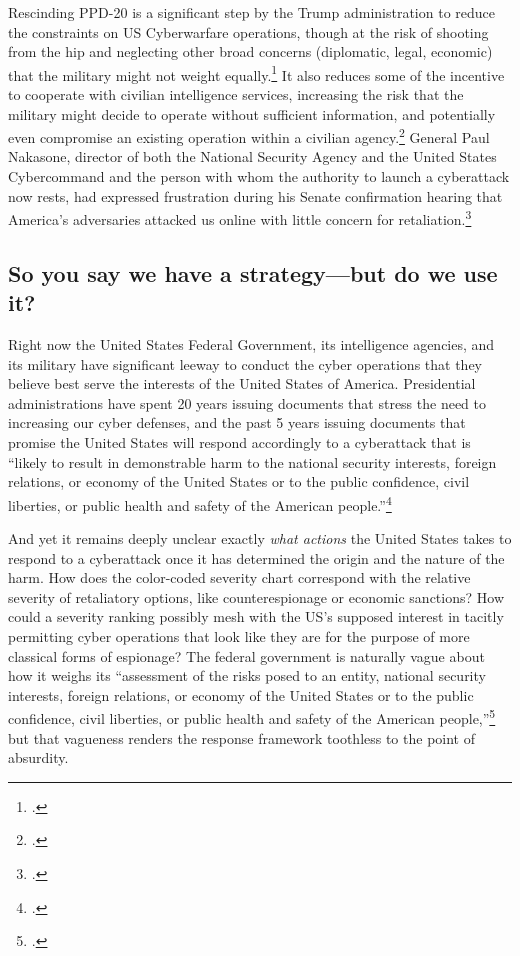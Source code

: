 \documentclass{report}
\begin{document}
\begin{refsegment}
Rescinding PPD-20 is a significant step by the Trump administration to reduce the constraints on US Cyberwarfare operations, though at the risk of shooting from the hip and neglecting other broad concerns (diplomatic, legal, economic) that the military might not weight equally.\footcite{starks_ramifications_2018} It also reduces some of the incentive to cooperate with civilian intelligence services, increasing the risk that the military might decide to operate without sufficient information, and potentially even compromise an existing operation within a civilian agency.\footcite{hawkins_cybersecurity_2018} General Paul Nakasone, director of both the National Security Agency and the United States Cybercommand and the person with whom the authority to launch a cyberattack now rests, had expressed frustration during his Senate confirmation hearing that America's  adversaries attacked us online with little concern for retaliation.\footcite{sanger_trump_2018}

\subsection{So you say we have a strategy---but do we use it?}
Right now the United States Federal Government, its intelligence agencies, and its military have significant leeway to conduct the cyber operations that they believe best serve the interests of the United States of America. Presidential administrations have spent 20 years issuing documents that stress the need to increasing our cyber defenses, and the past 5 years issuing documents that promise the United States will respond accordingly to a cyberattack that is ``likely to result in demonstrable harm to the national security interests, foreign relations, or economy of the United States or to the public confidence, civil liberties, or public health and safety of the American people.''\footcite{office_of_the_press_secretary_fact_2016}

And yet it remains deeply unclear exactly \emph{what actions} the United States takes to respond to a cyberattack once it has determined the origin and the nature of the harm. How does the color-coded severity chart correspond with the relative severity of retaliatory options, like counterespionage or economic sanctions? How could a severity ranking possibly mesh with the US's supposed interest in tacitly permitting cyber operations that look like they are for the purpose of more classical forms of espionage? The federal government is naturally vague about how it weighs its ``assessment of the risks posed to an entity, national security interests, foreign relations, or economy of the United States or to the public confidence, civil liberties, or public health and safety of the American people,''\footcite{office_of_the_press_secretary_fact_2016} but that vagueness renders the response framework toothless to the point of absurdity.


\end{refsegment}
\end{document}
